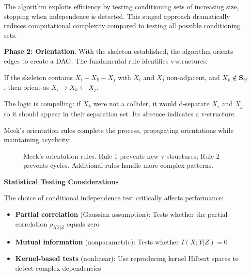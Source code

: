 The algorithm exploits efficiency by testing conditioning sets of increasing size, stopping when independence is detected. This staged approach dramatically reduces computational complexity compared to testing all possible conditioning sets.

\textbf{Phase 2: Orientation}. With the skeleton established, the algorithm orients edges to create a DAG. The fundamental rule identifies v-structures:

If the skeleton contains $X_i - X_k - X_j$ with $X_i$ and $X_j$ non-adjacent, and $X_k \notin \mathbf{S}_{ij}$, then orient as $X_i \rightarrow X_k \leftarrow X_j$.

The logic is compelling: if $X_k$ were not a collider, it would d-separate $X_i$ and $X_j$, so it should appear in their separation set. Its absence indicates a v-structure.

Meek's orientation rules complete the process, propagating orientations while maintaining acyclicity:

\begin{figure}[h!]
\centering
{}
\caption{Meek's orientation rules. Rule 1 prevents new v-structures; Rule 2 prevents cycles. Additional rules handle more complex patterns.}
\label{fig:meek_rules}
\end{figure}

\textbf{Statistical Testing Considerations}

The choice of conditional independence test critically affects performance:

\begin{itemize}
\item \textbf{Partial correlation} (Gaussian assumption): Tests whether the partial correlation $\rho_{XY|Z}$ equals zero
\item \textbf{Mutual information} (nonparametric): Tests whether $I(X;Y|Z) = 0$
\item \textbf{Kernel-based tests} (nonlinear): Use reproducing kernel Hilbert spaces to detect complex dependencies
\end{itemize}

